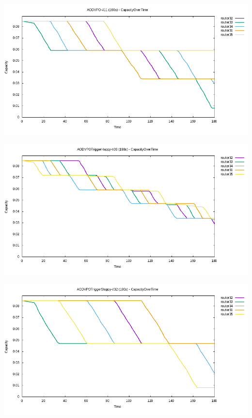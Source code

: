 \documentclass[11pt,handout,notes=only]{beamer}
\begin{document}
\begin{frame}{\insertsubsection}
\includegraphics[scale=0.45]{aodvpo-captime}
\end{frame}

\begin{frame}{\insertsubsection}
\includegraphics[scale=0.45]{aodvpohappy-captime}
\end{frame}

\begin{frame}{\insertsubsection}
\includegraphics[scale=0.45]{aodvposloppy-captime}
\end{frame}
\end{document}

